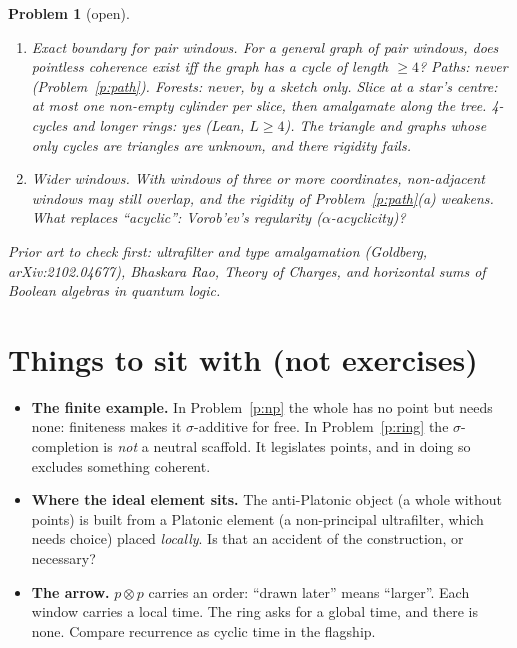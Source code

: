 \documentclass[11pt]{article}
\newtheorem{problem}{Problem}
\theoremstyle{definition}
\theoremstyle{remark}
\begin{document}
\begin{problem}[open]\label{p:open}
\begin{enumerate}[label=(\alph*)]
  \item \emph{Exact boundary for pair windows.} For a general graph of pair
    windows, does pointless coherence exist iff the graph has a cycle of length
    $\ge4$? Paths: never (Problem~\ref{p:path}). Forests: never, by a sketch only. Slice
at a star's centre: at most one non-empty cylinder per slice, then amalgamate
along the tree. 4-cycles
    and longer rings: yes (Lean, $L\ge4$). The triangle and graphs whose only
    cycles are triangles are unknown, and there rigidity fails.
  \item \emph{Wider windows.} With windows of three or more coordinates,
    non-adjacent windows may still overlap, and the rigidity of
    Problem~\ref{p:path}(a) weakens. What replaces ``acyclic'': Vorob'ev's
    regularity ($\alpha$-acyclicity)?
\end{enumerate}
Prior art to check first: ultrafilter and type amalgamation (Goldberg,
arXiv:2102.04677), Bhaskara Rao, \emph{Theory of Charges}, and horizontal sums of
Boolean algebras in quantum logic.
\end{problem}

\section*{Things to sit with (not exercises)}
\begin{itemize}
  \item \textbf{The finite example.} In Problem~\ref{p:np} the whole has no point
    but needs none: finiteness makes it $\sigma$-additive for free. In
    Problem~\ref{p:ring} the $\sigma$-completion is \emph{not} a neutral
    scaffold. It legislates points, and in doing so excludes something coherent.
  \item \textbf{Where the ideal element sits.} The anti-Platonic object (a whole
    without points) is built from a Platonic element (a non-principal
    ultrafilter, which needs choice) placed \emph{locally}. Is that an
    accident of the construction, or necessary?
  \item \textbf{The arrow.} $p\otimes p$ carries an order: ``drawn later'' means
    ``larger''. Each window carries a local time. The ring asks for a global
    time, and there is none. Compare recurrence as cyclic time in the flagship.
\end{itemize}
\end{document}
